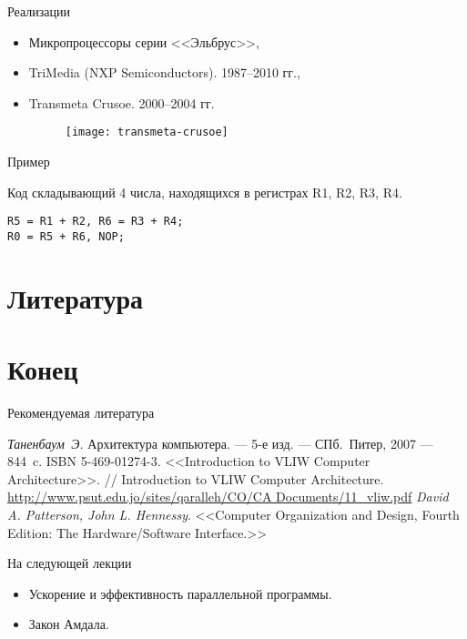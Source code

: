 \begin{frame}{Реализации}
\begin{itemize}
    \item Микропроцессоры серии <<Эльбрус>>,
    \item TriMedia (NXP Semiconductors). 1987--2010 гг.,
    \item Transmeta Crusoe. 2000--2004 гг.
    \begin{figure}[htbp]
        \texttt{[image: transmeta-crusoe]}
    \end{figure}
\end{itemize}
\end{frame}

\begin{frame}[fragile]{Пример}

Код складывающий 4 числа, находящихся в регистрах R1, R2, R3, R4.

\begin{lstlisting}
R5 = R1 + R2, R6 = R3 + R4;
R0 = R5 + R6, NOP;
\end{lstlisting}

\end{frame}

\section*{Литература}

\section*{Конец}

\begin{frame}[allowframebreaks]{Рекомендуемая литература}
\begin{thebibliography}{99}
    \bibitem{} \textit{Таненбаум~Э.} Архитектура компьютера. --- 5-е изд. ---
        СПб.~Питер, 2007 --- 844~c. ISBN 5-469-01274-3.
     <<Introduction to VLIW Computer Architecture>>. // Introduction to VLIW Computer Architecture. \url{http://www.psut.edu.jo/sites/qaralleh/CO/CA Documents/11_vliw.pdf}
     \textit{David A. Patterson, John L. Hennessy}. <<Computer Organization and Design, Fourth Edition: The Hardware/Software Interface.>>
\end{thebibliography}
\end{frame}

\begin{frame}{На следующей лекции}
\begin{itemize}
    \item Ускорение и эффективность параллельной программы.
    \item Закон Амдала.
\end{itemize}
\end{frame}

